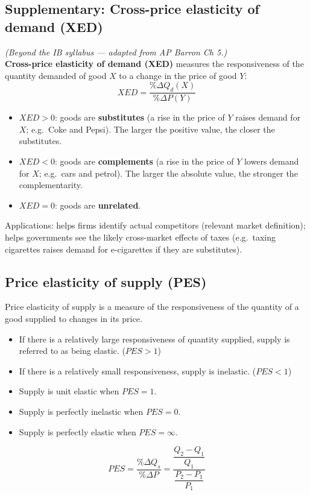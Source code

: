 \documentclass[a4paper,12pt]{article}
\newcommand{\needbold}[1]{\textcolor{red!70!black}{\textbf{#1}}}
\begin{document}
\subsection{Supplementary: Cross-price elasticity of demand (XED)}
\textit{(Beyond the IB syllabus --- adapted from AP Barron Ch 5.)}\\
\needbold{Cross-price elasticity of demand (XED)} measures the responsiveness of the quantity demanded of good $X$ to a change in the price of good $Y$:
\[XED=\dfrac{\%\Delta Q_d(X)}{\%\Delta P(Y)}\]
\begin{itemize}
  \item $XED>0$: goods are \textbf{substitutes} (a rise in the price of $Y$ raises demand for $X$; e.g.\ Coke and Pepsi). The larger the positive value, the closer the substitutes.
  \item $XED<0$: goods are \textbf{complements} (a rise in the price of $Y$ lowers demand for $X$; e.g.\ cars and petrol). The larger the absolute value, the stronger the complementarity.
  \item $XED=0$: goods are \textbf{unrelated}.
\end{itemize}
Applications: helps firms identify actual competitors (relevant market definition); helps governments see the likely cross-market effects of taxes (e.g.\ taxing cigarettes raises demand for e-cigarettes if they are substitutes).
\subsection{Price elasticity of supply (PES)}
Price elasticity of supply is a measure of the responsiveness of the quantity of a good supplied to changes in its price. 
\begin{itemize}
  \item If there is a relatively large responsiveness of quantity supplied, supply is referred to as being elastic. ($PES>1$)
  \item If there is a relatively small responsiveness, supply is inelastic. ($PES<1$)
  \item Supply is unit elastic when $PES = 1$.
  \item Supply is perfectly inelastic when $PES = 0$.
  \item Supply is perfectly elastic when $PES =\infty$.
\end{itemize}
\[PES=\dfrac{\%\Delta Q_s}{\%\Delta P}=\dfrac{\dfrac{Q_2-Q_1}{Q_1}}{\dfrac{P_2-P_1}{P_1}}\]
\end{document}
